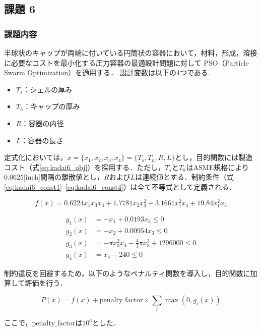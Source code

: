 \subsection{課題 6}

\subsubsection{課題内容}

半球状のキャップが両端に付いている円筒状の容器において，材料，形成，溶接に必要なコストを最小化する圧力容器の最適設計問題に対して PSO（Particle Swarm Optimization）を適用する．  
設計変数は以下の4つである.
\begin{itemize}
  \item $T_s$：シェルの厚み
  \item $T_h$：キャップの厚み
  \item $R$：容器の内径
  \item $L$：容器の長さ
\end{itemize}

定式化においては，$x = \{x_1, x_2, x_3, x_4\} = \{T_s, T_h, R, L\}$とし，目的関数には製造コスト（式\eqref{eq:kadai6_obj}）を採用する．ただし，$T_s$と$T_h$はASME規格により$0.0625$[inch]間隔の離散値とし，$R$および$L$は連続値とする．制約条件（式\eqref{eq:kadai6_const1}--\eqref{eq:kadai6_const4}）は全て不等式として定義される．

\begin{equation}
f(x) = 0.6224x_1x_3x_4 + 1.7781x_2x_3^2 + 3.1661x_1^2x_4 + 19.84x_1^2x_3
\label{eq:kadai6_obj}
\end{equation}

\begin{align}
g_1(x) &= -x_1 + 0.0193x_3 \leq 0 \label{eq:kadai6_const1}\\
g_2(x) &= -x_2 + 0.00954x_3 \leq 0 \label{eq:kadai6_const2}\\
g_3(x) &= -\pi x_3^2x_4 - \frac{4}{3}\pi x_3^3 + 1296000 \leq 0 \label{eq:kadai6_const3}\\
g_4(x) &= x_4 - 240 \leq 0 \label{eq:kadai6_const4}
\end{align}

制約違反を回避するため，以下のようなペナルティ関数を導入し，目的関数に加算して評価を行う．

\begin{equation}
P(x) = f(x) + \mathrm{penalty\_factor} \times \sum_i \max(0, g_i(x))
\label{eq:kadai6_penalty}
\end{equation}

ここで，$\mathrm{penalty\_factor}$は$10^6$とした．



